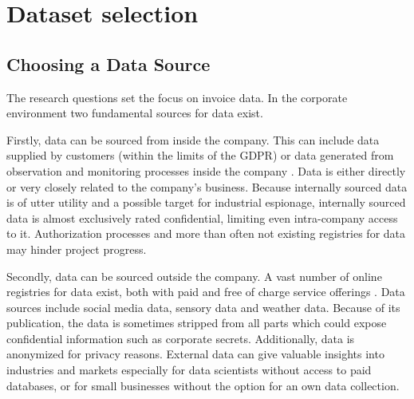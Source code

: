 \chapter{Dataset selection}

	\section{Choosing a Data Source}
	\label{data-source}
	
	The research questions set the focus on invoice data. In the corporate environment two fundamental sources for data exist. 
	
	Firstly, data can be sourced from inside the company. This can include data supplied by customers (within the limits of the GDPR) or data generated from observation and monitoring processes inside the company \cite{internalExternalData}. Data is either directly or very closely related to the company's business. Because internally sourced data is of utter utility and a possible target for industrial espionage, internally sourced data is almost exclusively rated confidential, limiting even intra-company access to it. Authorization processes and more than often not existing registries for data may hinder project progress.
	
	Secondly, data can be sourced outside the company. A vast number of online registries for data exist, both with paid and free of charge service offerings \cite{whyExternalData}. Data sources include social media data, sensory data and weather data. Because of its publication, the data is sometimes stripped from all parts which could expose confidential information such as corporate secrets. Additionally, data is anonymized for privacy reasons. External data can give valuable insights into industries and markets especially for data scientists without access to paid databases, or for small businesses without the option for an own data collection.
	
